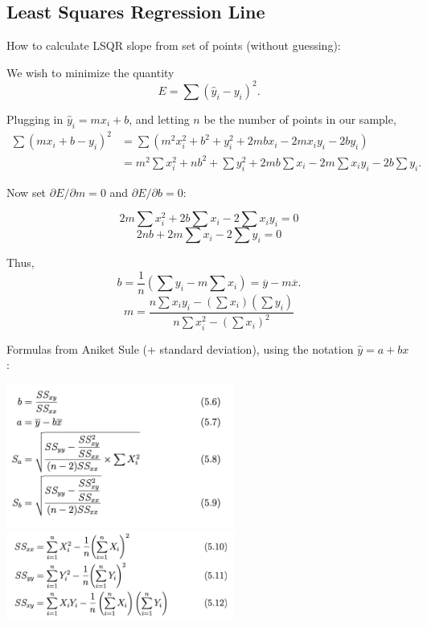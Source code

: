 \documentclass[12pt]{article}
\begin{document}
\subsection{Least Squares Regression Line}

How to calculate LSQR slope from set of points (without guessing):

We wish to minimize the quantity 
\[E = \sum (\hat{y}_i- y_i)^2.\]

Plugging in $\hat{y}_i = mx_i+b$, and letting $n$ be the number of points in our sample,
\begin{align*}
\sum (mx_i+b-y_i)^2 &= \sum (m^2x_i^2 + b^2 + y_i^2 + 2mbx_i - 2mx_iy_i - 2by_i) \\
&= m^2 \sum x_i^2 + nb^2 + \sum y_i^2 + 2mb\sum x_i - 2m\sum x_iy_i - 2b\sum y_i.
\end{align*}

Now set $\partial E/\partial m = 0$ and $\partial E/\partial b = 0$:

\[2m\sum x_i^2 + 2b\sum x_i - 2\sum x_iy_i = 0\]
\[2nb + 2m\sum x_i - 2\sum y_i = 0\]

Thus, 
\[b = \frac{1}{n}\left(\sum y_i - m\sum x_i\right) = \overline{y} - m\overline{x}.\]
\[m = \frac{n\sum x_i y_i - (\sum x_i)(\sum y_i)}{n\sum x_i^2 - (\sum x_i)^2}\]

Formulas from Aniket Sule (+ standard deviation), using the notation $\hat{y} = a+bx$:

\includegraphics[width=7.5cm]{images/lsqr1.png}
\includegraphics[width=7.5cm]{images/lsqr2.png}
\end{document}
